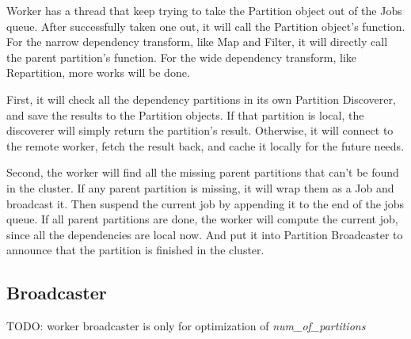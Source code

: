Worker has a thread that keep trying to take the Partition object out of the Jobs queue.
After successfully taken one out, it will call the Partition object's function.
For the narrow dependency transform, like Map and Filter, it will directly call the parent partition's function.
For the wide dependency transform, like Repartition, more works will be done.

First, it will check all the dependency partitions in its own Partition Discoverer,
and save the results to the Partition objects.
If that partition is local, the discoverer will simply return the partition's result.
Otherwise, it will connect to the remote worker, fetch the result back, and cache it locally for the future needs.

Second, the worker will find all the missing parent partitions that can't be found in the cluster.
If any parent partition is missing, it will wrap them as a Job and broadcast it.
Then suspend the current job by appending it to the end of the jobs queue.
If all parent partitions are done, the worker will compute the current job, since all the dependencies are local now.
And put it into Partition Broadcaster to announce that the partition is finished in the cluster.

\subsection{Broadcaster} %
\label{sub:broadcaster}
TODO: worker broadcaster is only for optimization of \emph{num\_of\_partitions}

